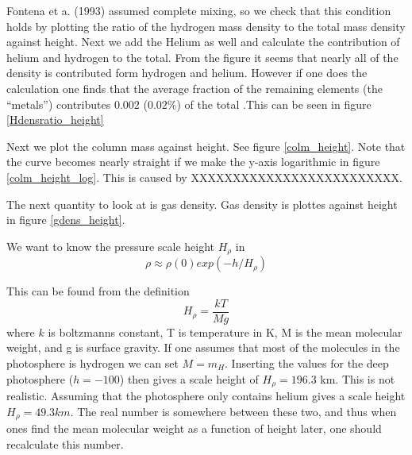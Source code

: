 \documentclass{aa}   %
\begin{document}
Fontena et a. (1993) assumed complete mixing, so we check that this condition holds by plotting the ratio of the hydrogen mass density to the total mass density against height. Next we add the Helium as well and calculate the contribution of helium and hydrogen to the total. From the figure it seems that nearly all of the density is contributed form hydrogen and helium. However if one does the calculation one finds that the average fraction of the remaining elements (the ``metals'') contributes $0.002$ ($0.02 \%$) of the total .This can be seen in figure \ref{Hdensratio_height}

Next we plot the column mass against height. See figure \ref{colm_height}. Note that the curve becomes nearly straight if we make the y-axis logarithmic in figure \ref{colm_height_log}. This is caused by XXXXXXXXXXXXXXXXXXXXXXXXX.


The next quantity to look at is gas density. Gas density is plottes against height in figure \ref{gdens_height}.


We want to know the pressure scale height $H_\rho$ in  
\begin{equation}
 \rho \approx \rho(0)exp(-h/H_{\rho})
\end{equation}

This can be found from the definition
\begin{equation}
 H_\rho = \frac{kT}{M g}
\end{equation}
where $k$ is boltzmanns constant, T is temperature in K, M is the mean molecular weight, and g is surface gravity.
If one assumes that most of the molecules in the photosphere is hydrogen we can set $M=m_H$. Inserting the values for the deep photosphere ($h = -100$) then gives a scale height of $H_\rho = 196.3$ km. This is not realistic. Assuming that the photosphere only contains helium gives a scale height $H_\rho = 49.3 km$. The real number is somewhere between these two, and thus when ones find the mean molecular weight as a function of height later, one should recalculate this number.
\end{document}
